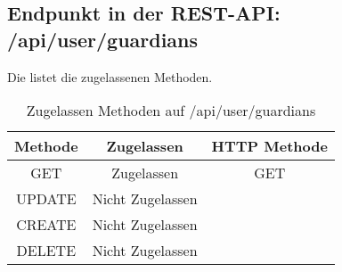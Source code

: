 \subsection{Endpunkt in der REST-API: /api/user/guardians}
Die  listet die zugelassenen Methoden. 

\begin{table}[!htbp]
	\begin{tabular}{|c|c|c|}
		\hline
			\textbf{Methode} & \textbf{Zugelassen} & \textbf{HTTP Methode} \\ \hline
			GET & Zugelassen & GET \\ \hline
			UPDATE & Nicht Zugelassen & \\ \hline 
			CREATE & Nicht Zugelassen & \\ \hline 
			DELETE & Nicht Zugelassen & \\ \hline
	\end{tabular}

		\caption{Zugelassen Methoden auf /api/user/guardians}
		\label{tab:end:rest:api:user:guardians:meth}
\end{table}